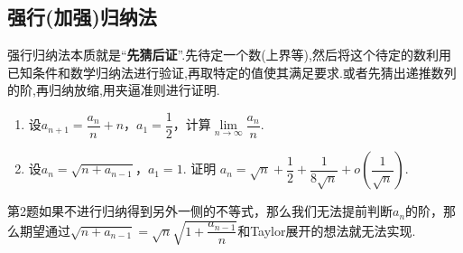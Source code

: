 \documentclass[../../main.tex]{subfiles}%
\begin{document}
\subsection{强行(加强)归纳法}

强行归纳法本质就是“\textbf{先猜后证}”.先待定一个数(上界等),然后将这个待定的数利用已知条件和数学归纳法进行验证,再取特定的值使其满足要求.或者先猜出递推数列的阶,再归纳放缩,用夹逼准则进行证明.

\begin{example}
\begin{enumerate}
\item 设$a_{n+1} = \dfrac{a_n}{n} + n$，$a_1 = \dfrac{1}{2}$，计算$\lim\limits_{n \to \infty} \dfrac{a_n}{n}$.

\item 设$a_n = \sqrt{n + a_{n-1}}$，$a_1 = 1$. 证明
$a_n = \sqrt{n} + \dfrac{1}{2} + \dfrac{1}{8\sqrt{n}} + o\left( \dfrac{1}{\sqrt{n}} \right).$
\end{enumerate}
\end{example}
\begin{note}
第2题如果不进行归纳得到另外一侧的不等式，那么我们无法提前判断$a_n$的阶，那么期望通过$\sqrt{n + a_{n-1}} = \sqrt{n}\sqrt{1 + \dfrac{a_{n-1}}{n}}$和Taylor展开的想法就无法实现.
\end{note}
\end{document}
